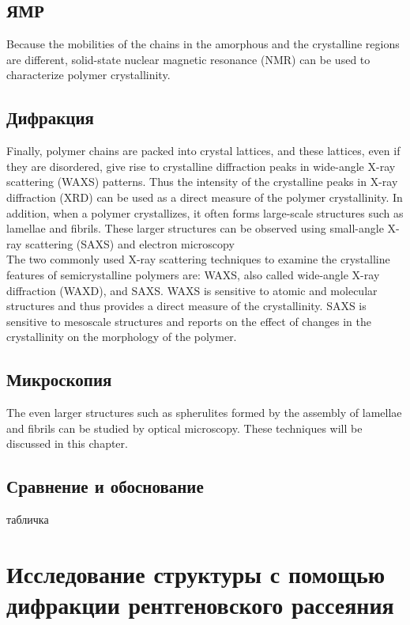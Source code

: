 \subsection{ЯМР}
Because the mobilities
of the chains in the amorphous and the crystalline regions are different, solid-state
nuclear magnetic resonance (NMR) can be used to characterize polymer crystallinity.


\subsection{Дифракция}
Finally, polymer chains are packed into crystal lattices, and these lattices, even if they
are disordered, give rise to crystalline diffraction peaks in wide-angle X-ray scattering
(WAXS) patterns. Thus the intensity of the crystalline peaks in X-ray diffraction
(XRD) can be used as a direct measure of the polymer crystallinity. In addition,
when a polymer crystallizes, it often forms large-scale structures such as lamellae
and fibrils. These larger structures can be observed using small-angle X-ray scattering
(SAXS) and electron microscopy\\
The two commonly used X-ray scattering techniques to examine the crystalline
features of semicrystalline polymers are: WAXS, also called wide-angle X-ray
diffraction (WAXD), and SAXS. WAXS is sensitive to atomic and molecular structures
and thus provides a direct measure of the crystallinity. SAXS is sensitive to
mesoscale structures and reports on the effect of changes in the crystallinity on
the morphology of the polymer.\\

\subsection{Микроскопия}
The even larger structures such as spherulites
formed by the assembly of lamellae and fibrils can be studied by optical microscopy.
These techniques will be discussed in this chapter.

\subsection{Сравнение и обоснование}
табличка

\section{Исследование структуры с помощью дифракции рентгеновского рассеяния}

